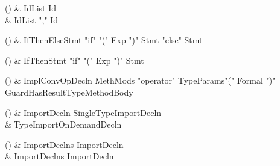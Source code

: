 \begin{bbgrammarappendix}{4.4in}

() & IdList \label{prod:IdList}  \: Id  \\

 &    \| IdList \xcd"," Id \\

\end{bbgrammarappendix}

\begin{bbgrammarappendix}{3.6in}

() & IfThenElseStmt \label{prod:IfThenElseStmt}  \: \xcd"if" \xcd"(" Exp \xcd")" Stmt  \xcd"else" Stmt   \\


\end{bbgrammarappendix}

\begin{bbgrammarappendix}{4.0in}

() & IfThenStmt \label{prod:IfThenStmt}  \: \xcd"if" \xcd"(" Exp \xcd")" Stmt  \\


\end{bbgrammarappendix}

\begin{bbgrammarappendix}{3.5in}

() & ImplConvOpDecln \label{prod:ImplConvOpDecln}  \: MethMods \xcd"operator" TypeParams\opt \xcd"(" Formal  \xcd")" Guard\opt HasResultType\opt MethodBody  \\


\end{bbgrammarappendix}

\begin{bbgrammarappendix}{3.9in}

() & ImportDecln \label{prod:ImportDecln}  \: SingleTypeImportDecln  \\

 &    \| TypeImportOnDemandDecln \\

\end{bbgrammarappendix}

\begin{bbgrammarappendix}{3.8in}

() & ImportDeclns \label{prod:ImportDeclns}  \: ImportDecln  \\

 &    \| ImportDeclns ImportDecln \\

\end{bbgrammarappendix}

